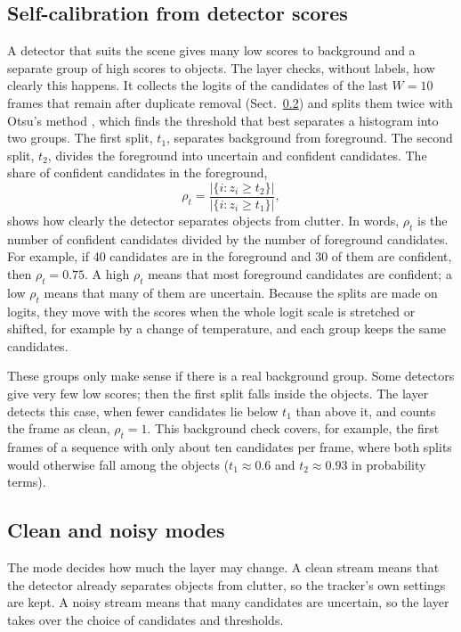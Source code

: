 \documentclass[pdflatex,referee,sn-mathphys-num]{sn-jnl}
\begin{document}
\subsection{Self-calibration from detector scores}\label{sec:calib}
A detector that suits the scene gives many low scores to background and a
separate group of high scores to objects. The layer checks, without labels,
how clearly this happens. It collects the logits of the candidates of the
last $W=10$ frames that remain after duplicate removal
(Sect.~\ref{sec:regimes}) and splits them twice with Otsu's method \cite{otsu1979},
which finds the threshold that best separates a histogram into two groups.
The first split, $t_1$, separates background from foreground. The second
split, $t_2$, divides the foreground into uncertain and confident candidates.
The share of confident candidates in the foreground,
\begin{equation}
\rho_t=\frac{\left|\{i: z_i\ge t_2\}\right|}{\left|\{i: z_i\ge t_1\}\right|},
\label{eq:rho}
\end{equation}
shows how clearly the detector separates objects from clutter. In words,
$\rho_t$ is the number of confident candidates divided by the number of
foreground candidates. For example, if 40 candidates are in the foreground
and 30 of them are confident, then $\rho_t=0.75$. A high $\rho_t$ means that most foreground candidates are confident; a low $\rho_t$
means that many of them are uncertain. Because the splits are made on
logits, they move with the scores when the whole logit scale is stretched or
shifted, for example by a change of temperature, and each group keeps the
same candidates.

These groups only make sense if there is a real background group. Some
detectors give very few low scores; then the first split falls inside the
objects. The layer detects this case, when fewer candidates lie below $t_1$
than above it, and counts the frame as clean, $\rho_t=1$. This background
check covers, for example, the first frames of a sequence with only about
ten candidates per frame, where both splits would otherwise fall among the
objects ($t_1\approx0.6$ and $t_2\approx0.93$ in probability terms).

\subsection{Clean and noisy modes}\label{sec:regimes}
The mode decides how much the layer may change. A clean stream means that
the detector already separates objects from clutter, so the tracker's own
settings are kept. A noisy stream means that many candidates are uncertain,
so the layer takes over the choice of candidates and thresholds.
\end{document}
